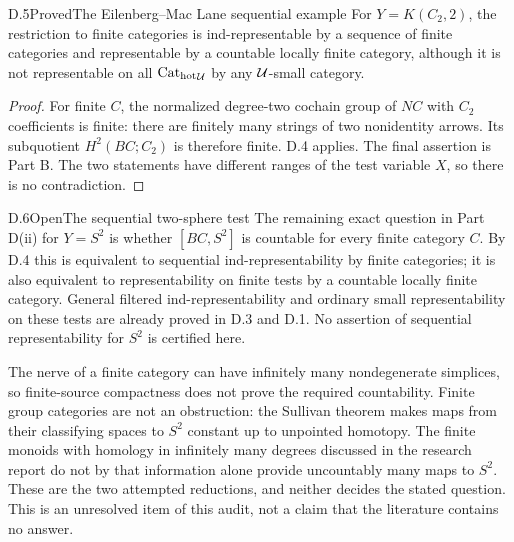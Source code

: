 \begin{claim}{D.5}{Proved}{The Eilenberg--Mac Lane sequential example}
For $Y=K(C_2,2)$, the restriction to finite categories is ind-representable by a sequence of finite categories and representable by a countable locally finite category, although it is not representable on all ${\mathrm{Cat}_{\mathrm{hot}}}_\mathcal U$ by any $\mathcal U$-small category.
\end{claim}
\begin{proof}
For finite $C$, the normalized degree-two cochain group of $NC$ with $C_2$ coefficients is finite: there are finitely many strings of two nonidentity arrows. Its subquotient $H^2(BC;C_2)$ is therefore finite. D.4 applies. The final assertion is Part B. The two statements have different ranges of the test variable $X$, so there is no contradiction.
\end{proof}

\begin{claim}{D.6}{Open}{The sequential two-sphere test}
The remaining exact question in Part D(ii) for $Y=S^2$ is whether $[BC,S^2]$ is countable for every finite category $C$. By D.4 this is equivalent to sequential ind-representability by finite categories; it is also equivalent to representability on finite tests by a countable locally finite category. General filtered ind-representability and ordinary small representability on these tests are already proved in D.3 and D.1. No assertion of sequential representability for $S^2$ is certified here.
\end{claim}
The nerve of a finite category can have infinitely many nondegenerate simplices, so finite-source compactness does not prove the required countability. Finite group categories are not an obstruction: the Sullivan theorem \citep[Theorem~A]{Miller1984} makes maps from their classifying spaces to $S^2$ constant up to unpointed homotopy. The finite monoids with homology in infinitely many degrees discussed in the research report do not by that information alone provide uncountably many maps to $S^2$. These are the two attempted reductions, and neither decides the stated question. This is an unresolved item of this audit, not a claim that the literature contains no answer.

